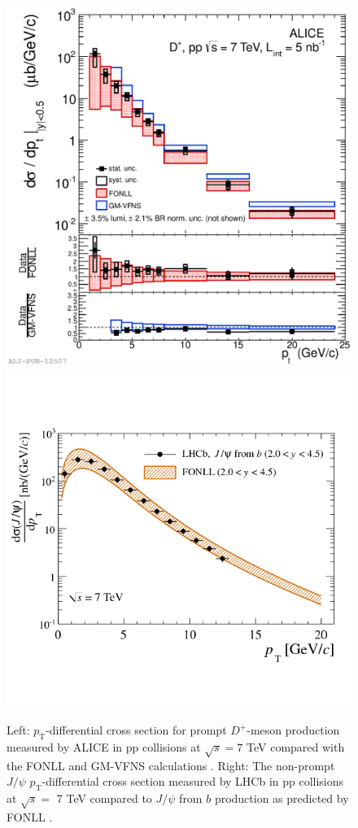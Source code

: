 \documentclass[b5paper,10pt,twoside,oldstyle,classica]{toptesi}
\newcommand{\pt}{p_\text{T}}
\begin{document}
\begin{figure}[hb]
\begin{center}
{\includegraphics[scale = 0.3]{2012-Jun-06-DplusCrossSection_pp7TeV.eps}}
\hspace{0cm}
{\includegraphics[scale = 0.3]{jpsi_nonprompt_LHCb.png}}
\caption{Left: $\pt$-differential cross section for prompt $D^+$-meson production measured by ALICE in pp collisions at $\sqrt{s} = 7$ TeV compared with the FONLL and GM-VFNS calculations \cite{ALICE:2011aa}. Right: The non-prompt $J/\psi$ $\pt$-differential cross section measured by LHCb in pp collisions at $\sqrt{s} =$ 7 TeV compared to $J/\psi$ from $b$ production as predicted by FONLL \cite{Aaij:2011jh}.}
\label{HF_pp}
\end{center}
\end{figure}
\end{document}
